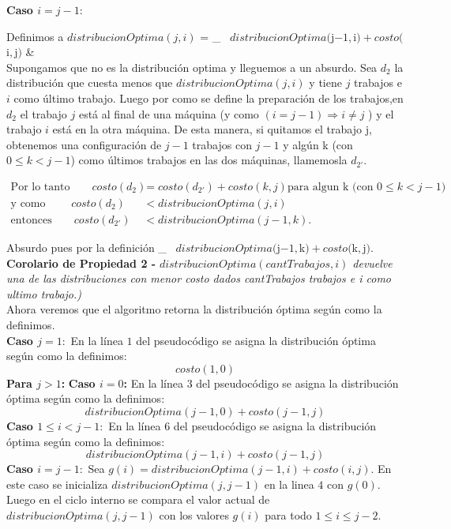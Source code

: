 \textbf{Caso $i = j-1:$}

Definimos a $ distribucionOptima(j,i) $ =  
\displaystyle \min_{} \ $distribucionOptima($j$-1,$i$) + costo($i$,$j$)$
 & \\
 
Supongamos que no es la distribución optima y lleguemos a un absurdo.
Sea $d_2$ la distribución que cuesta menos que $ distribucionOptima(j,i) $ y tiene $j$ trabajos e $i$ como último trabajo.
Luego por como se 
define la preparación de los trabajos,en $d_2$ el trabajo $j$ está al final de una máquina (y como $(i = j-1) \Rightarrow i \neq j $ )
y el trabajo $i$ está en la otra máquina.
De esta manera, si quitamos el trabajo j, obtenemos una configuración de $j-1$ trabajos con $j-1$
y algún k (con $ 0 \le k < j-1$) como últimos trabajos en las dos máquinas, llamemosla $d_{2'}$.

\begin{align*}
\text{Por lo tanto}
\qquad costo (d_2) &= costo (d_{2'}) + costo(k,j)  \text{para algun k (con }  0 \le k < j-1) \\
\text{y como }
 \qquad costo(d_2) &<  distribucionOptima(j,i) \\ 
\text{entonces}
 \qquad costo (d_{2'}) &< distribucionOptima(j-1,k). 
\end{align*}

Absurdo pues por la definición
\displaystyle \min_{} \ $distribucionOptima($j$-1,$k$) + costo($k$,$j$)$. \\

\textbf{Corolario de Propiedad 2 -} \emph{$ distribucionOptima(cantTrabajos,i) $ devuelve una de las distribuciones con menor costo dados
cantTrabajos trabajos e i como ultimo trabajo.)}\\

Ahora veremos que el algoritmo retorna la distribución óptima según como la definimos.\\
\textbf{Caso $j = 1:$} En la línea $1$ del pseudocódigo se asigna la distribución óptima según como la definimos:
$$costo(1,0)$$
\textbf{Para $j > 1$:}
\textbf{Caso $i = 0$:} En la línea $3$ del pseudocódigo se asigna la distribución óptima según como la definimos:
$$distribucionOptima(j-1,0) + costo(j-1,j)$$
\textbf{Caso $1 \le i < j-1:$} En la línea $6$ del pseudocódigo se asigna la distribución óptima según como la definimos:
$$distribucionOptima(j-1,i) + costo(j-1,j)$$
\textbf{Caso $i = j-1:$} Sea $g(i) = distribucionOptima(j-1,i) + costo(i,j).$
En este caso se inicializa $distribucionOptima(j,j-1)$ en la linea $4$ con $g(0)$.
Luego en el ciclo interno se compara el valor actual de $distribucionOptima(j,j-1)$ con los valores
$g(i)$ para todo $ 1 \le i \le j-2 $. 


